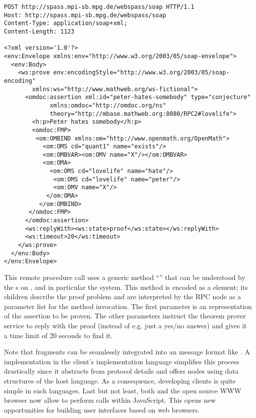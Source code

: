 \begin{omgroup}[id=rpc,short=Communication between Systems]
\begin{lstlisting}[label=lst:rpc-prover,
  caption={A {\soap} RPC call to {\spass}}]
POST http://spass.mpi-sb.mpg.de/webspass/soap HTTP/1.1
Host: http://spass.mpi-sb.mpg.de/webspass/soap
Content-Type: application/soap+xml; 
Content-Length: 1123

<?xml version='1.0'?>
<env:Envelope xmlns:env="http://www.w3.org/2003/05/soap-envelope">
  <env:Body>
    <ws:prove env:encodingStyle="http://www.w3.org/2003/05/soap-encoding"
        xmlns:ws="http://www.mathweb.org/ws-fictional">
      <omdoc:assertion xml:id="peter-hates-somebody" type="conjecture"
             xmlns:omdoc="http://omdoc.org/ns"
             theory="http://mbase.mathweb.org:8080/RPC2#lovelife"> 
        <h:p>Peter hates somebody</h:p> 
        <omdoc:FMP> 
         <om:OMBIND xmlns:om="http://www.openmath.org/OpenMath"> 
           <om:OMS cd="quant1" name="exists"/> 
           <om:OMBVAR><om:OMV name="X"/></om:OMBVAR> 
           <om:OMA> 
             <om:OMS cd="lovelife" name="hate"/> 
              <om:OMS cd="lovelife" name="peter"/> 
              <om:OMV name="X"/> 
            </om:OMA> 
          </om:OMBIND> 
       </omdoc:FMP> 
      </omdoc:assertion> 
      <ws:replyWith><ws:state>proof</ws:state></ws:replyWith>
      <ws:timeout>20</ws:timeout>
    </ws:prove>
  </env:Body>
</env:Envelope>
\end{lstlisting}
This {\soap} remote procedure call uses a generic method ``{}'' that can be
understood by the {s} on {\mathwebsb}, and in
particular the {\spass} system. This method is encoded as a {}
element; its children describe the proof problem and are interpreted by the {\soap} RPC
node as a parameter list for the method invocation.  The first parameter is an {\omdoc}
representation of the assertion to be proven. The other parameters instruct the theorem
prover service to reply with the proof (instead of e.g. just a yes/no answer) and gives it
a time limit of 20 seconds to find it.

Note that {\omdoc} fragments can be seamlessly integrated into an {\xml} message format
like {\soap}. A {\soap} implementation in the client's implementation language simplifies
this process drastically since it abstracts from {\http} protocol details and offers
{\soap} nodes using data structures of the host language.  As a consequence, developing
{\mathweb} clients is quite simple in such languages.  Last but not least, both {\msie}
and the open source WWW browser {\firefox} now allow to perform {\soap} calls within
JavaScript. This opens new opportunities for building user interfaces based on web
browsers.


\end{omgroup}
